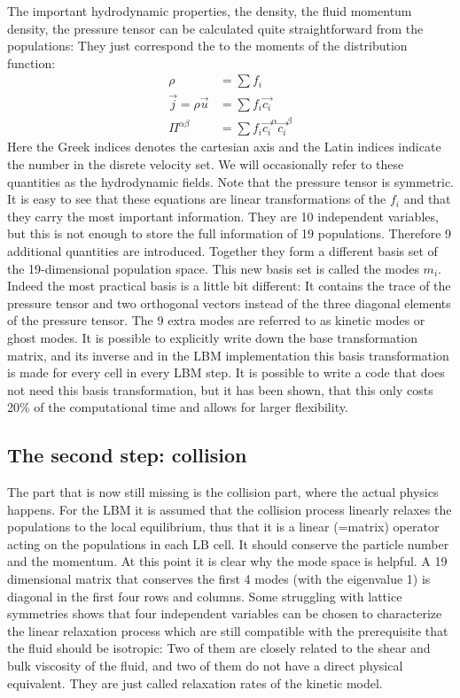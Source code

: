 The important hydrodynamic properties, the density, the fluid momentum density,
the pressure tensor can be calculated quite straightforward from
the populations: They just correspond the to the moments
of the distribution function: 
\begin{align}
  \rho &= \sum f_i \\
  \vec{j} = \rho \vec{u} &= \sum f_i \vec{c_i} \\
  \Pi^{\alpha \beta} &= \sum f_i \vec{c_i}^{\alpha}\vec{c_i}^{\beta} 
  \label{eq:fields}
\end{align}
Here the Greek indices denotes the cartesian axis and the
Latin indices indicate the number in the disrete velocity set.
We will occasionally refer to these quantities as the hydrodynamic fields.
Note that the pressure tensor is symmetric.
It is easy to see that these equations are linear transformations
of the $f_i$ and that they carry the most important information. They
are 10 independent variables, but this is not enough to store the
full information of 19 populations. Therefore 9 additional quantities
are introduced. Together they form a different basis set of the
19-dimensional population space. This new basis set is called
the modes $m_i$. Indeed the most practical basis is a little bit different:
It contains the trace of the pressure tensor and two orthogonal 
vectors instead of the three diagonal elements of the pressure 
tensor. The 9 extra modes are referred to as kinetic modes or
ghost modes. It is possible to explicitly write down the 
base transformation matrix, and its inverse and in the \ES{}
LBM implementation this basis transformation is made for every
cell in every LBM step. It is possible to write a code that does not
need this basis transformation, but it has been shown, that this
only costs 20\% of the computational time and allows for 
larger flexibility.

\subsection*{The second step: collision}

The part that is now still missing is the collision part, where
the actual physics happens. For the LBM it is assumed that
the collision process linearly relaxes the populations to the local
equilibrium, thus that it is a linear (=matrix) operator 
acting on the populations in each LB cell. It should conserve 
the particle number and the momentum. At this point it is clear
why the mode space is helpful. A 19 dimensional matrix that
conserves the first 4 modes (with the eigenvalue 1) is diagonal in the
first four rows and columns.
Some struggling with lattice symmetries shows that four independent
variables can be chosen to characterize the linear relaxation
process which are still compatible with the prerequisite that
the fluid should be isotropic: Two of them are closely related to 
the shear and bulk viscosity of the fluid, and two of them
do not have a direct physical equivalent. They are just called
relaxation rates of the kinetic model.


